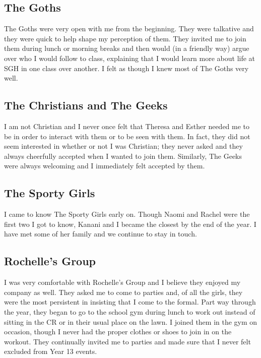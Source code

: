 
\subsection{The Goths}
The Goths were very open with me from the beginning.  They were talkative and they were quick to help shape my perception of them.  They invited me to join them during lunch or morning breaks and then would (in a friendly way) argue over who I would follow to class, explaining that I would learn more about life at SGH in one class over another.  I felt as though I knew most of The Goths very well.
 
\subsection{The Christians and The Geeks} 
I am not Christian and I never once felt that Theresa and Esther needed me to be in order to interact with them or to be seen with them.  In fact, they did not seem interested in whether or not I was Christian; they never asked and they always cheerfully accepted when I wanted to join them.  Similarly, The Geeks were always welcoming and I immediately felt accepted by them.  

\subsection{The Sporty Girls}
I came to know The Sporty Girls early on.  Though Naomi and Rachel were the first two I got to know, Kanani and I became the closest by the end of the year.  I have met some of her family and we continue to stay in touch.

\subsection{Rochelle's Group}
I was very comfortable with Rochelle's Group and I believe they enjoyed my company as well.  They asked me to come to parties and, of all the girls, they were the most persistent in insisting that I come to the formal.  Part way through the year, they began to go to the school gym during lunch to work out instead of sitting in the CR or in their usual place on the lawn.  I joined them in the gym on occasion, though I never had the proper clothes or shoes to join in on the workout.  They continually invited me to parties and made sure that I never felt excluded from Year 13 events.

